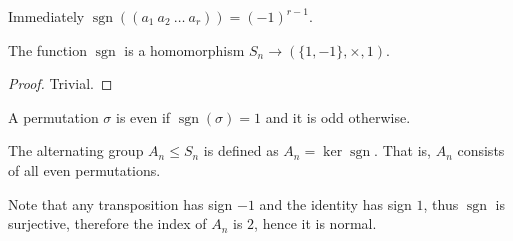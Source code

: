 Immediately $\operatorname{sgn}((a_1\ a_2\ \ldots\ a_r))=(-1)^{r-1}$.
\begin{corollary}
    The function $\operatorname{sgn}$ is a homomorphism $S_n\to (\{1,-1\},\times,1)$.
\end{corollary}
\begin{proof}
    Trivial.
\end{proof}
\begin{definition}
    A permutation $\sigma$ is even if $\operatorname{sgn}(\sigma)=1$ and it is odd otherwise.
\end{definition}
\begin{definition}
    The alternating group $A_n\le S_n$ is defined as $A_n=\ker\operatorname{sgn}$.
    That is, $A_n$ consists of all even permutations.
\end{definition}
Note that any transposition has sign $-1$ and the identity has sign $1$, thus $\operatorname{sgn}$ is surjective, therefore the index of $A_n$ is $2$, hence it is normal.
